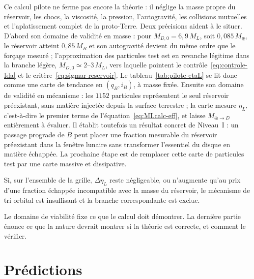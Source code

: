 \documentclass[11pt,a4paper,openany]{report}
\newcommand{\Mt}{M_{\oplus}}
\begin{document}
\begin{controle}
Ce calcul pilote ne ferme pas encore la théorie : il néglige la masse propre du réservoir, les chocs,
la viscosité, la pression, l'autogravité, les collisions mutuelles et l'aplatissement complet de la
proto-Terre. Deux précisions aident à le situer. D'abord son domaine de validité en masse : pour
$M_{D,0}=6{,}9\,M_L$, soit $0{,}085\,\Mt$, le réservoir atteint $0{,}85\,M_B$ et son autogravité
devient du même ordre que le forçage mesuré ; l'approximation des particules test est en revanche
légitime dans la branche légère, $M_{D,0}\simeq2$--$3\,M_L$, vers laquelle pointent le
contrôle~\eqref{eq:controle-Ida} et le critère~\eqref{eq:sigmar-reservoir}. Le
tableau~\ref{tab:pilote-etaL} se lit donc comme une carte de tendance en $(q_B,i_B)$, à masse
fixée. Ensuite son domaine de validité en mécanisme : les $1152$ particules représentent le seul
réservoir préexistant, sans matière injectée depuis la surface terrestre ; la carte mesure
$\eta_L$, c'est-à-dire le premier terme de l'équation~\eqref{eq:MLcalc-eff}, et laisse
$M_{\oplus\to D}$ entièrement à évaluer. Il établit toutefois un résultat concret de Niveau~I : un passage prograde de $B$ peut
placer une fraction mesurable du réservoir préexistant dans la fenêtre lunaire sans transformer
l'essentiel du disque en matière échappée. La prochaine étape est de remplacer cette carte de
particules test par une carte massive et dissipative.
\end{controle}

\begin{falsif}
Si, sur l'ensemble de la grille, $\Delta\eta_L$ reste négligeable, ou n'augmente qu'au prix d'une
fraction échappée incompatible avec la masse du réservoir, le mécanisme de tri orbital est
insuffisant et la branche correspondante est exclue.
\end{falsif}

\begin{rappel}
Le domaine de viabilité fixe ce que le calcul doit démontrer. La dernière partie énonce ce que la
nature devrait montrer si la théorie est correcte, et comment le vérifier.
\end{rappel}

\part{Prédictions}
\label{part:predictions}
\end{document}
